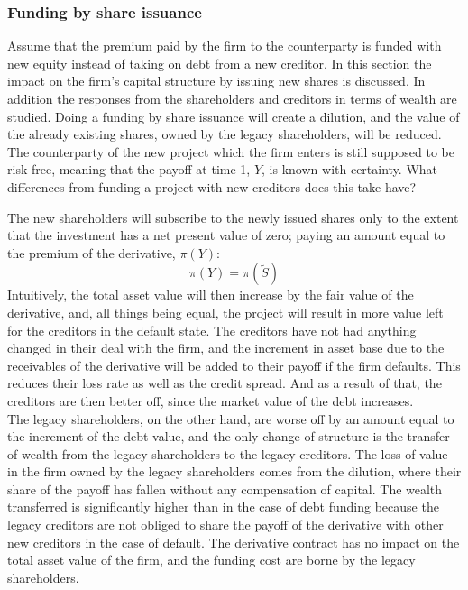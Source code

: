\documentclass[main.tex]{subfiles}
\begin{document}
    \subsubsection{Funding by share issuance}
        Assume that the premium paid by the firm to the counterparty is funded with new equity instead of taking on debt from a new creditor. 
        In this section the impact on the firm's capital structure by issuing new shares is discussed.
        In addition the responses from the shareholders and creditors in terms of wealth are studied. 
        Doing a funding by share issuance will create a dilution, and the value of the already existing shares, owned by the legacy shareholders, will be reduced. 
        The counterparty of the new project which the firm enters is still supposed to be risk free, meaning that the payoff at time 1, $Y$, is known with certainty. 
        What differences from funding a project with new creditors does this take have?

        The new shareholders will subscribe to the newly issued shares only to the extent that the investment has a net present value of zero; paying an amount equal to the premium of the derivative, $\pi(Y)$:
        \begin{equation}\label{eqn:derivative-zero-npv}
            \pi(Y) = \pi(\tilde{S})
        \end{equation}
        Intuitively, the total asset value will then increase by the fair value of the derivative, and, all things being equal, the project will result in more value left for the creditors in the default state. 
        The creditors have not had anything changed in their deal with the firm, and the increment in asset base due to the receivables of the derivative will be added to their payoff if the firm defaults. 
        This reduces their loss rate as well as the credit spread.
        And as a result of that, the creditors are then better off, since the market value of the debt increases.\\
        The legacy shareholders, on the other hand, are worse off by an amount equal to the increment of the debt value, and the only change of structure is the transfer of wealth from the legacy shareholders to the legacy creditors. 
        The loss of value in the firm owned by the legacy shareholders comes from the dilution, where their share of the payoff has fallen without any compensation of capital. 
        The wealth transferred is significantly higher than in the case of debt funding because the legacy creditors are not obliged to share the payoff of the derivative with other new creditors in the case of default. 
        The derivative contract has no impact on the total asset value of the firm, and the funding cost are borne by the legacy shareholders.
\end{document}
